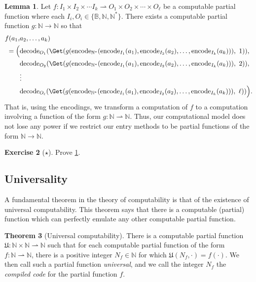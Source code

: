 \documentclass[11pt,a4paper,reqno]{amsart}
\theoremstyle{plain}
\theoremstyle{definition}
\newtheorem{theorem}{Theorem}[section]
\newtheorem{lemma}[theorem]{Lemma}
\theoremstyle{definition}
\newtheorem{exercise}[theorem]{Exercise}
\newcommand\exerciseLevelEasy{$\star$}
\begin{document}
\begin{lemma}\label{lem:reduction-in-complex}
	Let $f\colon I_1\times I_2 \times\cdots I_k \rightharpoonup O_1\times O_2 \times \cdots \times O_\ell$ be a computable partial function where each $I_i,O_i \in \{\mathbb B, \mathbb N, \mathbb N^*\}$.
	There exists a computable partial function $g\colon \mathbb N\to\mathbb N$ so that
	\begin{align*}
		f(a_1, & a_2,\ldots,a_k) \\
		=
		\Big(
		       &
		\mathrm{decode}_{O_1}(\Get(
		g(\mathrm{encode}_{\mathbb N^*}(
		\mathrm{encode}_{I_1}(a_1),
		\mathrm{encode}_{I_2}(a_2),
		\ldots,
		\mathrm{encode}_{I_k}(a_k)
		))
		,\ 1)),
		\\
		       &
		\mathrm{decode}_{O_2}(\Get(
		g(\mathrm{encode}_{\mathbb N^*}(
		\mathrm{encode}_{I_1}(a_1),
		\mathrm{encode}_{I_2}(a_2),
		\ldots,
		\mathrm{encode}_{I_k}(a_k)
		))
		,\ 2)),
		\\
		       & \vdots
		\\
		       &
		\mathrm{decode}_{O_\ell}(\Get(
		g(\mathrm{encode}_{\mathbb N^*}(
		\mathrm{encode}_{I_1}(a_1),
		\mathrm{encode}_{I_2}(a_2),
		\ldots,
		\mathrm{encode}_{I_k}(a_k)
		))
		,\ \ell))
		\Big).
	\end{align*}
	That is, using the encodings, we transform a computation of $f$ to a computation involving a function of the form $g\colon \mathbb N \rightharpoonup \mathbb N$.
	Thus, our computational model does not lose any power if we restrict our entry methods to be partial functions of the form $\mathbb N \to\mathbb N$.
\end{lemma}
\begin{exercise}[\exerciseLevelEasy]
	Prove \cref{lem:reduction-in-complex}.
\end{exercise}

\subsection{Universality}

A fundamental theorem in the theory of computability is that of the existence of universal computability.
This theorem says that there is a computable (partial) function which can perfectly emulate any other computable partial function.

\begin{theorem}[Universal computability]\label{thm:universality}
	There is a computable partial function $\mathfrak U\colon \mathbb N\times \mathbb N \rightharpoonup \mathbb N$ such that for each computable partial function of the form $f\colon \mathbb N \rightharpoonup \mathbb N$, there is a positive integer $N_f\in \mathbb N$ for which $\mathfrak U(N_f, \cdot) = f(\cdot)$.
	We then call such a partial function \emph{universal}, and we call the integer $N_f$ the \emph{compiled code} for the partial function $f$.
\end{theorem}
\end{document}
